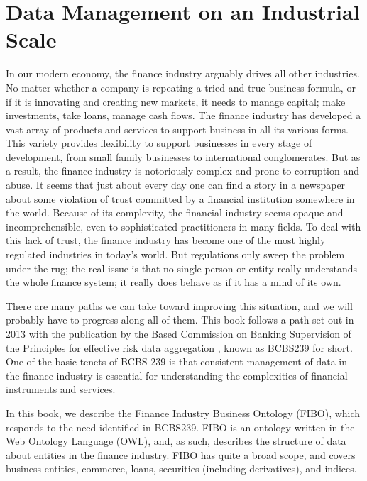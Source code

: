 
\chapter{Data Management on an Industrial Scale}
\label{ch01}

In our modern economy, the finance industry arguably drives all other industries. No matter whether a company is repeating a tried and true business formula, or if it is innovating and creating new markets, it needs to manage capital; make investments, take loans, manage cash flows.  The finance industry has developed a vast array of products and services to support business in all its various forms.  This variety provides flexibility to support businesses in every stage of development, from small family businesses to international conglomerates.  But as a result, the finance industry is notoriously complex and prone to corruption and abuse. It seems that just about every day one can find a story in a newspaper about some violation of trust committed by a financial institution somewhere in the world. Because of its complexity, the financial industry seems opaque and incomprehensible, even to sophisticated practitioners in many  fields. To deal with this lack of trust, the finance industry has become one of the most highly regulated industries in today’s world.  But regulations only sweep the problem under the rug; the real issue is that no single person or entity really understands the whole finance system; it really does behave as if it has a mind of its own. 

There are many paths we can take toward improving this situation, and we will probably have to progress along all of them.  This book follows a path set out in 2013 with the publication by the Based Commission on Banking Supervision of the Principles for effective risk data aggregation \cite{basel2013principles}, known as BCBS239 for short. One of the basic tenets of BCBS 239 is that consistent management of data in the finance industry is essential for understanding the complexities of financial instruments and services.  

In this book, we describe the Finance Industry Business Ontology (FIBO), which responds to the need identified in BCBS239.  FIBO is an ontology written in the Web Ontology Language (OWL), and, as such, describes the structure of data about entities in the finance industry.  FIBO has quite a broad scope, and covers business entities, commerce, loans, securities (including derivatives), and indices.  


